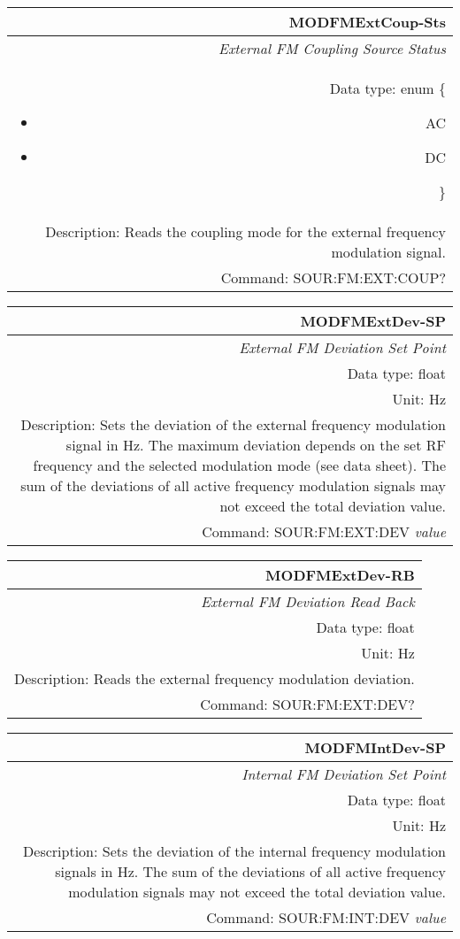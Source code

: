 \documentclass[openany]{article}
\begin{document}
		\begin{tabular}{N}
			\hline
			\bfseries MODFMExtCoup-Sts \\ \hline
			\emph{External FM Coupling Source Status} \\
			Data type: enum \{\begin{itemize}[noitemsep]
				\small
				\item[] AC
				\item[] DC
			\end{itemize}\} \\ 
			Description: Reads the coupling mode for the external frequency modulation signal. \\
			Command: SOUR:FM:EXT:COUP? \\

		\end{tabular}
%
		\begin{tabular}{N}
			\hline
			\bfseries MODFMExtDev-SP \\ \hline
			\emph{External FM Deviation Set Point} \\
			Data type: float \\
			Unit: Hz \\ 
			Description: Sets the deviation of the external frequency modulation signal in Hz. The maximum deviation depends on the set RF frequency and the selected modulation mode (see data sheet). The sum of the deviations of all active frequency modulation signals may not exceed the total deviation value. \\
			Command: SOUR:FM:EXT:DEV \emph{value} \\
			
		\end{tabular}


		\begin{tabular}{N}
			\hline
			\bfseries MODFMExtDev-RB \\ \hline
			\emph{External FM Deviation Read Back} \\
			Data type: float \\
			Unit: Hz \\
			Description: Reads the external frequency modulation deviation. \\
			Command: SOUR:FM:EXT:DEV? \\

		\end{tabular}
%
		\begin{tabular}{N}
			\hline
			\bfseries MODFMIntDev-SP \\ \hline
			\emph{Internal FM Deviation Set Point} \\
			Data type: float \\
			Unit: Hz \\ 
			Description: Sets the deviation of the internal frequency modulation signals in Hz. The sum of the deviations of all active frequency modulation signals may not exceed the total deviation value. \\
			Command: SOUR:FM:INT:DEV \emph{value} \\
			
		\end{tabular}
\end{document}
